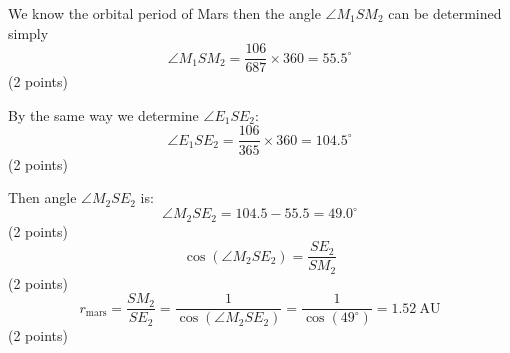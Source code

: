 We know the orbital period of Mars then the angle $\angle M_1 S M_2$ can be
determined simply
\[
\angle M_1 S M_2 = \frac{106}{687}\times 360 = 55.5^\circ
\]
\hfill(2 points)

By the same way we determine $\angle E_1 S E_2$:
\[
\angle E_1 S E_2 = \frac{106}{365}\times 360 = 104.5^\circ
\]
\hfill(2 points)

Then angle $\angle M_2 S E_2$ is:
\[
\angle M_2 S E_2 = 104.5 - 55.5 = 49.0^\circ
\]
\hfill(2 points)
\[
\cos(\angle M_2 S E_2) = \frac{SE_2}{SM_2}
\]
\hfill(2 points)
\[
r_{\mathrm{mars}} = \frac{SM_2}{SE_2}
 = \frac{1}{\cos(\angle M_2 S E_2)}
 = \frac{1}{\cos(49^\circ)} = 1.52\ \mathrm{AU}
\]
\hfill(2 points)
